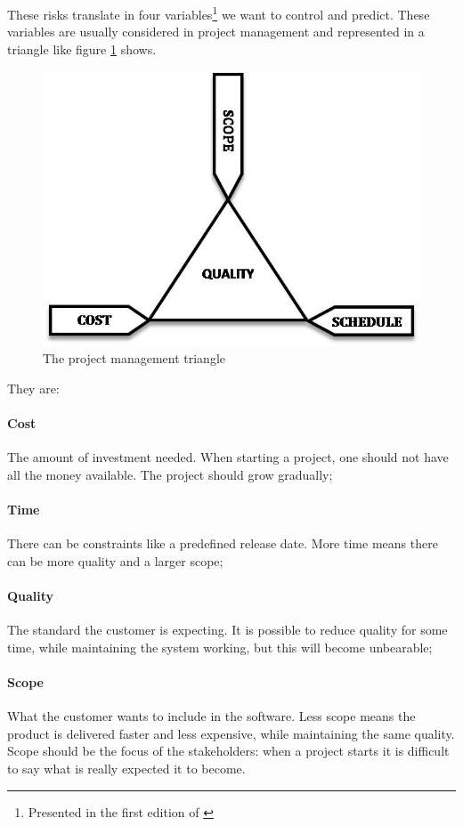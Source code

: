 \documentclass[conference]{IEEEtran}
\begin{document}
These risks translate in four variables\footnote{Presented in the first edition of \cite{Beck:2004tc}} we want to control and predict.
These variables are usually considered in project management and represented in a triangle like figure \ref{fig:triad} shows.

\begin{figure}
\centering
\includegraphics[width=0.7\linewidth]{The_triad_constraints.jpg}
\caption{The project management triangle\cite{pmtwiki}}
\label{fig:triad}
\end{figure}

They are:
\paragraph{Cost} The amount of investment needed. When starting a project, one should not have all the money available. The project should grow gradually;
\paragraph{Time} There can be constraints like a predefined release date. More time means there can be more quality and a larger scope;
\paragraph{Quality} The standard the customer is expecting. It is possible to reduce quality for some time, while maintaining the system working, but this will become unbearable;
\paragraph{Scope} What the customer wants to include in the software. Less scope means the product is delivered faster and less expensive, while maintaining the same quality. Scope should be the focus of the stakeholders: when a project starts it is difficult to say what is really expected it to become.
\end{document}
